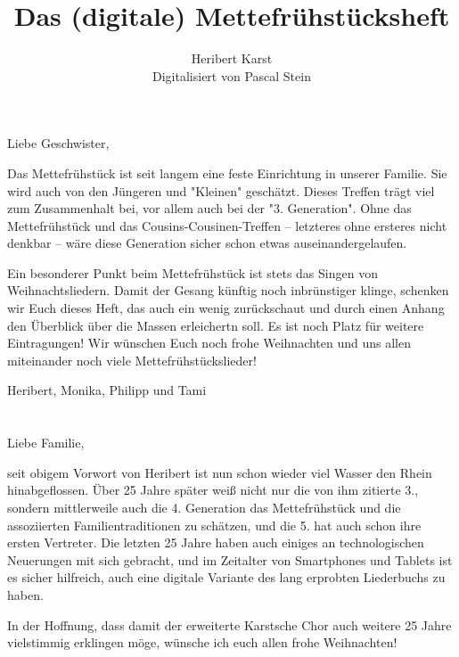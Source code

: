\documentclass[11pt]{article}
\title{Das (digitale) Mettefrühstücksheft}
\author{
  Heribert Karst
  \\[3ex]
  \small Digitalisiert von Pascal Stein
}
\begin{document}
\maketitle
\newpage
\begin{multicols}{2}
\tableofcontents
\end{multicols}
\pagestyle{empty}

\section*{}

Liebe Geschwister,

Das Mettefrühstück ist seit langem eine feste Einrichtung in unserer Familie.
Sie wird auch von den Jüngeren und "Kleinen" geschätzt.
Dieses Treffen trägt viel zum Zusammenhalt bei, vor allem auch bei der "3. Generation".
Ohne das Mettefrühstück und das Cousins-Cousinen-Treffen -- letzteres ohne ersteres nicht denkbar --
wäre diese Generation sicher schon etwas auseinandergelaufen.

Ein besonderer Punkt beim Mettefrühstück ist stets das Singen von Weihnachtsliedern.
Damit der Gesang künftig noch inbrünstiger klinge, schenken wir Euch dieses Heft, das auch ein wenig zurückschaut
und durch einen Anhang den Überblick über die Massen erleichertn soll.
Es ist noch Platz für weitere Eintragungen!
Wir wünschen Euch noch frohe Weihnachten und uns allen miteinander noch viele Mettefrühstückslieder!

Heribert, Monika, Philipp und Tami

\section*{}

Liebe Familie,

seit obigem Vorwort von Heribert ist nun schon wieder viel Wasser den Rhein hinabgeflossen.
Über 25 Jahre später weiß nicht nur die von ihm zitierte 3., 
sondern mittlerweile auch die 4. Generation das Mettefrühstück und die assoziierten Familientraditionen zu schätzen,
und die 5. hat auch schon ihre ersten Vertreter.
Die letzten 25 Jahre haben auch einiges an technologischen Neuerungen mit sich gebracht,
und im Zeitalter von Smartphones und Tablets ist es sicher hilfreich, auch eine digitale Variante des lang erprobten Liederbuchs zu haben.

In der Hoffnung, dass damit der erweiterte Karstsche Chor auch weitere 25 Jahre vielstimmig erklingen möge,
wünsche ich euch allen frohe Weihnachten!
\end{document}
